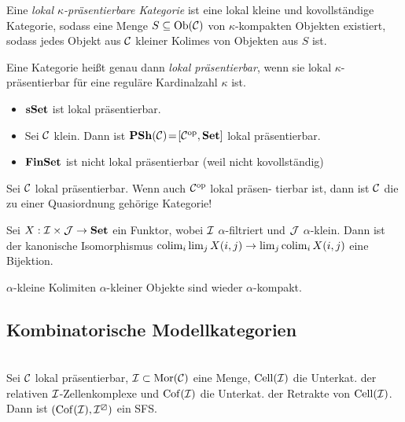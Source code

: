 \documentclass{cheat-sheet}
\newcommand{\lhhe}{\boxslash} %
\DeclareMathOperator{\Cell}{Cell} %
\DeclareMathOperator{\Coff}{Cof} %
\begin{document}
\begin{defn}
  Eine \emph{lokal $\kappa$-präsentierbare Kategorie} ist eine lokal kleine und kovollständige Kategorie, sodass eine Menge $S \subseteq \operatorname{Ob}(\mathcal{C})$ von $\kappa$-kompakten Objekten existiert, sodass jedes Objekt aus $\mathcal{C}$ kleiner Kolimes von Objekten aus $S$ ist.
\end{defn}


\begin{defn}
  Eine Kategorie heißt genau dann \emph{lokal präsentierbar}, wenn sie lokal $\kappa$-präsentierbar für eine reguläre Kardinalzahl $\kappa$ ist.
\end{defn}

\begin{bspe}
  \begin{itemize}
    \item $\mathbf{sSet}$ ist lokal präsentierbar.
    \item Sei $\mathcal{C}$ klein. Dann ist $\mathbf{PSh}(\mathcal{C}) \!=\! [\mathcal{C}^{\mathrm{op}}, \mathbf{Set}]$ lokal präsentierbar.
    \item $\mathbf{FinSet}$ ist nicht lokal präsentierbar (weil nicht kovollständig)
  \end{itemize}
\end{bspe}

\begin{fun}
  Sei $\mathcal{C}$ lokal präsentierbar. Wenn auch $\mathcal{C}^{\mathrm{op}}$ lokal präsen- tierbar ist, dann ist $\mathcal{C}$ die zu einer Quasiordnung gehörige Kategorie!
\end{fun}

\begin{lem}
  Sei $X : \mathcal{I} \times \mathcal{J} \to \mathbf{Set}$ ein Funktor, wobei $\mathcal{I}$ $\alpha$-filtriert und $\mathcal{J}$ $\alpha$-klein.
  Dann ist der kanonische Isomorphismus $\operatorname{colim}_i \lim_j X(i, j) \to \lim_j \operatorname{colim}_i X(i, j)$ eine Bijektion.
\end{lem}

\begin{bsp}
  $\alpha$-kleine Kolimiten $\alpha$-kleiner Objekte sind wieder $\alpha$-kompakt.
\end{bsp}

\subsection{Kombinatorische Modellkategorien}

\begin{lem}\mbox{}\\
  Sei $\mathcal{C}$ lokal präsentierbar, $\mathcal{I} \subset \operatorname{Mor}(\mathcal{C})$ eine Menge, $\Cell(\Iat)$ die Unterkat. der relativen $\mathcal{I}$-Zellenkomplexe und $\Coff(\Iat)$ die Unterkat. der Retrakte von $\Cell(\Iat)$.
  Dann ist $(\Coff(\Iat), \Iat^\lhhe)$ ein SFS.
\end{lem}
\end{document}
